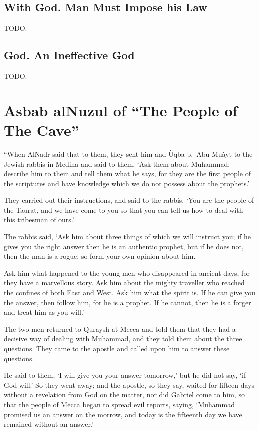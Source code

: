 \documentclass[12pt]{memoir}
\begin{document}
\section{With God. Man Must Impose his Law}
TODO:
\section{God. An Ineffective God}
TODO:

\clearpage
\appendix
\addappheadtotoc

\chapter{Asbab al\–Nuzul of “The People of The Cave”}
\label{apdx:cave}

“When Al\–Nadr said that to them, they sent him and \`Uqba b.\ Abu Mu\`ayt
to the Jewish rabbis in Medina and said to them, ‘Ask them about Muhammad;
describe him to them and tell them what he says,
for they are the first people of the scriptures
and have knowledge which we do not possess about the prophets.’

They carried out their instructions, and said to the rabbis,
‘You are the people of the Taurat, and we have come to you
so that you can tell us how to deal with this tribesman of ours.’

The rabbis said, ‘Ask him about three things of which we will instruct you;
if he gives you the right answer then he is an authentic prophet,
but if he does not, then the man is a rogue,
so form your own opinion about him.

Ask him what happened to the young men who disappeared in ancient days,
for they have a marvellous story.
Ask him about the mighty traveller
who reached the confines of both East and West.
Ask him what the spirit is.
If he can give you the answer, then follow him, for he is a prophet.
If he cannot, then he is a forger and treat him as you will.’

The two men returned to Quraysh at Mecca and told them
that they had a decisive way of dealing with Muhammad,
and they told them about the three questions.
They came to the apostle and called upon him to answer these questions.

He said to them, ‘I will give you your answer tomorrow,’
but he did not say, ‘if God will.’
So they went away; and the apostle, so they say,
waited for fifteen days without a revelation from God on the matter,
nor did Gabriel come to him, so that the people of Mecca
began to spread evil reports, saying,
‘Muhammad promised us an answer on the morrow,
and today is the fifteenth day we have remained without an answer.’
\end{document}
